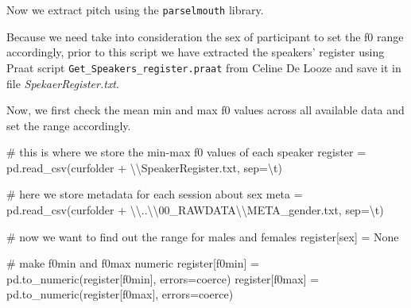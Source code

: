 \documentclass[
  letterpaper,
  DIV=11,
  numbers=noendperiod]{scrreprt}
\newenvironment{Shaded}{\begin{snugshade}}{\end{snugshade}}
\newcommand{\CharTok}[1]{\textcolor[rgb]{0.13,0.47,0.30}{#1}}
\newcommand{\CommentTok}[1]{\textcolor[rgb]{0.37,0.37,0.37}{#1}}
\newcommand{\NormalTok}[1]{\textcolor[rgb]{0.00,0.23,0.31}{#1}}
\newcommand{\OperatorTok}[1]{\textcolor[rgb]{0.37,0.37,0.37}{#1}}
\newcommand{\StringTok}[1]{\textcolor[rgb]{0.13,0.47,0.30}{#1}}
\newcommand{\VariableTok}[1]{\textcolor[rgb]{0.07,0.07,0.07}{#1}}
\begin{document}
Now we extract pitch using the \texttt{parselmouth} library.

Because we need take into consideration the sex of participant to set
the f0 range accordingly, prior to this script we have extracted the
speakers' register using Praat script
\texttt{Get\_Speakers\_register.praat} from Celine De Looze and save it
in file \emph{SpekaerRegister.txt}.

Now, we first check the mean min and max f0 values across all available
data and set the range accordingly.

\begin{Shaded}
\begin{Highlighting}[]
\CommentTok{\# this is where we store the min{-}max f0 values of each speaker}
\NormalTok{register }\OperatorTok{=}\NormalTok{ pd.read\_csv(curfolder }\OperatorTok{+} \StringTok{\textquotesingle{}}\CharTok{\textbackslash{}\textbackslash{}}\StringTok{SpeakerRegister.txt\textquotesingle{}}\NormalTok{, sep}\OperatorTok{=}\StringTok{\textquotesingle{}}\CharTok{\textbackslash{}t}\StringTok{\textquotesingle{}}\NormalTok{) }

\CommentTok{\# here we store metadata for each session about sex}
\NormalTok{meta }\OperatorTok{=}\NormalTok{ pd.read\_csv(curfolder }\OperatorTok{+} \StringTok{\textquotesingle{}}\CharTok{\textbackslash{}\textbackslash{}}\StringTok{..}\CharTok{\textbackslash{}\textbackslash{}}\StringTok{00\_RAWDATA}\CharTok{\textbackslash{}\textbackslash{}}\StringTok{META\_gender.txt\textquotesingle{}}\NormalTok{, sep}\OperatorTok{=}\StringTok{\textquotesingle{}}\CharTok{\textbackslash{}t}\StringTok{\textquotesingle{}}\NormalTok{)}

\CommentTok{\# now we want to find out the range for males and females}
\NormalTok{register[}\StringTok{\textquotesingle{}sex\textquotesingle{}}\NormalTok{] }\OperatorTok{=} \VariableTok{None}

\CommentTok{\# make f0min and f0max numeric}
\NormalTok{register[}\StringTok{\textquotesingle{}f0min\textquotesingle{}}\NormalTok{] }\OperatorTok{=}\NormalTok{ pd.to\_numeric(register[}\StringTok{\textquotesingle{}f0min\textquotesingle{}}\NormalTok{], errors}\OperatorTok{=}\StringTok{\textquotesingle{}coerce\textquotesingle{}}\NormalTok{)}
\NormalTok{register[}\StringTok{\textquotesingle{}f0max\textquotesingle{}}\NormalTok{] }\OperatorTok{=}\NormalTok{ pd.to\_numeric(register[}\StringTok{\textquotesingle{}f0max\textquotesingle{}}\NormalTok{], errors}\OperatorTok{=}\StringTok{\textquotesingle{}coerce\textquotesingle{}}\NormalTok{)}


\end{Highlighting}
\end{Shaded}
\end{document}
